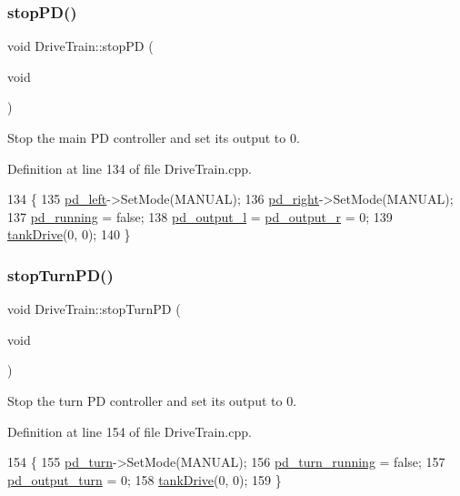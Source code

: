 \subsubsection{\texorpdfstring{stop\+P\+D()}{stopPD()}}
{\footnotesize\ttfamily void Drive\+Train\+::stop\+PD (\begin{DoxyParamCaption}\item[{void}]{ }\end{DoxyParamCaption})}



Stop the main PD controller and set its output to 0. 



Definition at line 134 of file Drive\+Train.\+cpp.


\begin{DoxyCode}
134                             \{
135     \hyperlink{class_drive_train_a89603458433a6b9beffc91e6fa73f32d}{pd\_left}->SetMode(MANUAL);
136     \hyperlink{class_drive_train_ab132e86e29dbc4e7d5613786658719f0}{pd\_right}->SetMode(MANUAL);
137     \hyperlink{class_drive_train_a24c0d92ca340c9afda1544f6ab67ea11}{pd\_running} = \textcolor{keyword}{false};
138     \hyperlink{class_drive_train_a53268d36c28c3ed0e70aaf69086d4953}{pd\_output\_l} = \hyperlink{class_drive_train_a4c3242a549d04b72192e5cf9e590845e}{pd\_output\_r} = 0;
139     \hyperlink{class_drive_train_a60ef155b4f149532a2ae872edc0e2cc2}{tankDrive}(0, 0);
140 \}
\end{DoxyCode}
\mbox{\label{class_drive_train_a74a6ee807665e54f51a1fc88284a5f04}} 
\subsubsection{\texorpdfstring{stop\+Turn\+P\+D()}{stopTurnPD()}}
{\footnotesize\ttfamily void Drive\+Train\+::stop\+Turn\+PD (\begin{DoxyParamCaption}\item[{void}]{ }\end{DoxyParamCaption})}



Stop the turn PD controller and set its output to 0. 



Definition at line 154 of file Drive\+Train.\+cpp.


\begin{DoxyCode}
154                                 \{
155     \hyperlink{class_drive_train_a709deffb7683fd3efe0f340580a8e5e0}{pd\_turn}->SetMode(MANUAL);
156     \hyperlink{class_drive_train_afc2305d5c7646a92d9875973ff2f7e67}{pd\_turn\_running} = \textcolor{keyword}{false};
157     \hyperlink{class_drive_train_a65aa0053b0648cf1fea8d0f0fc21c04e}{pd\_output\_turn} = 0;
158     \hyperlink{class_drive_train_a60ef155b4f149532a2ae872edc0e2cc2}{tankDrive}(0, 0);
159 \}
\end{DoxyCode}
\mbox{\label{class_drive_train_a60ef155b4f149532a2ae872edc0e2cc2}} 
